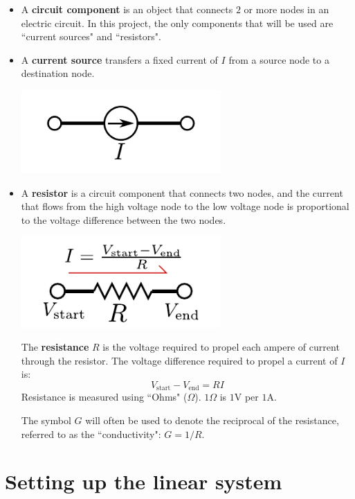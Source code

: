 \documentclass{article}
\begin{document}
\begin{itemize}
\item A {\bf circuit component} is an object that connects \(2\) or more nodes in an electric circuit. In this project, the only components that will be used are ``current sources" and ``resistors". 
\item A {\bf current source} transfers a fixed current of \(I\) from a source node to a destination node. %

\includegraphics[width = 0.6\textwidth]{current_source}
\item A {\bf resistor} is a circuit component that connects two nodes, and the current that flows from the high voltage node to the low voltage node is proportional to the voltage difference between the two nodes.

\includegraphics[width = 0.6\textwidth]{resistor} 

The {\bf resistance} \(R\) is the voltage required to propel each ampere of current through the resistor. The voltage difference required to propel a current of \(I\) is:
\[V_{\text{start}} - V_{\text{end}} = R I\] 
Resistance is measured using ``Ohms" (\(\Omega\)). \(1\Omega\) is \(1\text{V}\) per \(1\text{A}\).

The symbol \(G\) will often be used to denote the reciprocal of the resistance, referred to as the ``conductivity": \(G = 1/R\).
\end{itemize}



\section{Setting up the linear system}
\end{document}
